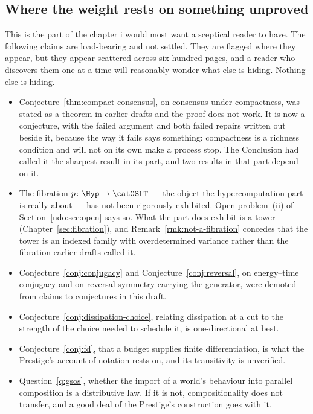 \subsection*{Where the weight rests on something unproved}

This is the part of the chapter i would most want a sceptical
reader to have.
The following claims are load-bearing and not settled.
They are flagged where they appear, but they appear scattered
across six hundred pages, and a reader who discovers them one at a
time will reasonably wonder what else is hiding.
Nothing else is hiding.

\begin{itemize}[leftmargin=1.6em, itemsep=4pt]
\item Conjecture~\ref{thm:compact-consensus}, on consensus under
      compactness, was stated as a theorem in earlier drafts and the
      proof does not work.
      It is now a conjecture, with the failed argument and both
      failed repairs written out beside it, because the way it fails
      says something: compactness is a richness condition and will
      not on its own make a process stop.
      The Conclusion had called it the sharpest result in its part,
      and two results in that part depend on it.
\item The fibration $p\colon\Hyp\to\catGSLT$ --- the object the
      hypercomputation part is really about --- has not been
      rigorously exhibited.
      Open problem~(ii) of Section~\ref{ndo:sec:open} says so.
      What the part does exhibit is a tower
      (Chapter~\ref{sec:fibration}), and
      Remark~\ref{rmk:not-a-fibration} concedes that the tower is an
      indexed family with overdetermined variance rather than the
      fibration earlier drafts called it.
\item Conjecture~\ref{conj:conjugacy} and
      Conjecture~\ref{conj:reversal}, on energy--time conjugacy
      and on reversal symmetry carrying the generator, were
      demoted from claims to conjectures in this draft.
\item Conjecture~\ref{conj:dissipation-choice}, relating
      dissipation at a cut to the strength of the choice needed to
      schedule it, is one-directional at best.
\item Conjecture~\ref{conj:fd}, that a budget supplies finite
      differentiation, is what the Prestige's account of notation
      rests on, and its transitivity is unverified.
\item Question~\ref{q:gsos}, whether the import of a world's
      behaviour into parallel composition is a distributive law.
      If it is not, compositionality does not transfer, and a
      good deal of the Prestige's construction goes with it.
\end{itemize}

